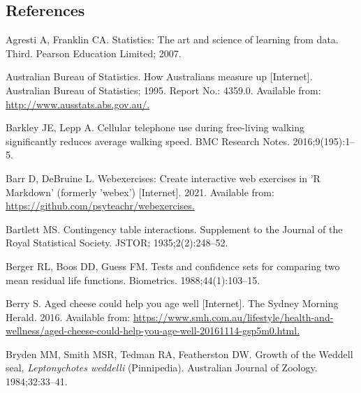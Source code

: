 \documentclass[
  11pt,
  a4paper,
  krantz2]{krantz}
\newlength{\cslhangindent}
\newenvironment{CSLReferences}[2] %
 {\begin{list}{}{%
  \setlength{\itemindent}{0pt}
  \setlength{\leftmargin}{0pt}
  \setlength{\parsep}{0pt}
  \ifodd #1
   \setlength{\leftmargin}{\cslhangindent}
   \setlength{\itemindent}{-1\cslhangindent}
  \fi
  \setlength{\itemsep}{#2\baselineskip}}}
 {\end{list}}
\begin{document}
\begin{footnotesize}

\chapter*{References}\label{references}


\protect{}\label{refs}
\begin{CSLReferences}{1}{0}
Agresti A, Franklin CA. Statistics: {T}he art and science of learning from data. Third. Pearson Education Limited; 2007.

Australian Bureau of Statistics. How {A}ustralians measure up {[}Internet{]}. {A}ustralian {B}ureau of {S}tatistics; 1995. Report No.: 4359.0. Available from: \href{http://www.ausstats.abs.gov.au/}{http://www.ausstats.abs.gov.au/.}

Barkley JE, Lepp A. Cellular telephone use during free-living walking significantly reduces average walking speed. {BMC} Research Notes. 2016;9(195):1--5.

Barr D, DeBruine L. Webexercises: Create interactive web exercises in '{R Markdown}' (formerly 'webex') {[}Internet{]}. 2021. Available from: \href{https://github.com/psyteachr/webexercises}{https://github.com/psyteachr/webexercises.}

Bartlett MS. Contingency table interactions. Supplement to the Journal of the Royal Statistical Society. JSTOR; 1935;2(2):248--52.

Berger RL, Boos DD, Guess FM. Tests and confidence sets for comparing two mean residual life functions. Biometrics. 1988;44(1):103--15.

Berry S. Aged cheese could help you age well {[}Internet{]}. The Sydney Morning Herald. 2016. Available from: \href{https://www.smh.com.au/lifestyle/health-and-wellness/aged-cheese-could-help-you-age-well-20161114-gsp5m0.html}{https://www.smh.com.au/lifestyle/health-and-wellness/aged-cheese-could-help-you-age-well-20161114-gsp5m0.html.}

Bryden MM, Smith MSR, Tedman RA, Featherston DW. Growth of the {W}eddell seal, {\emph{Leptonychotes weddelli}} ({P}innipedia). {A}ustralian Journal of Zoology. 1984;32:33--41.


\end{CSLReferences}
\end{footnotesize}
\end{document}
